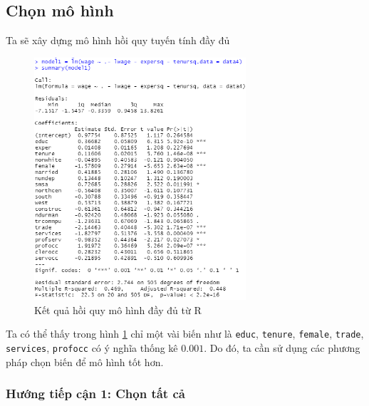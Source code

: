 \subsection*{Chọn mô hình}
Ta sẽ xây dựng mô hình hồi quy tuyến tính đầy đủ

\begin{figure}[H]
	\centering
	\includegraphics[width=0.7\textwidth]{../Photo Of Result/full-model-data4}
	\caption{Kết quả hồi quy mô hình đầy đủ từ R}
	\label{full-model}
\end{figure}

Ta có thể thấy trong hình \ref{full-model} chỉ một vài biến như là \texttt{educ}, \texttt{tenure}, \texttt{female}, \texttt{trade}, \texttt{services}, \texttt{profocc} có ý nghĩa thống kê $0.001$. Do đó, ta cần sử dụng các phương pháp chọn biến để mô hình tốt hơn.
\subsubsection*{Hướng tiếp cận 1: Chọn tất cả}


